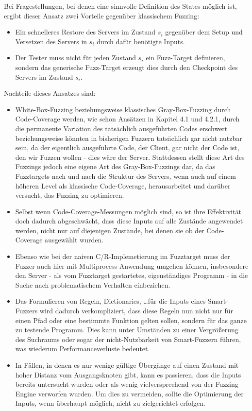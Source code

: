 \documentclass[a4paper]{article}
\begin{document}
Bei Fragestellungen, bei denen eine sinnvolle Definition des States möglich ist, ergibt dieser Ansatz zwei Vorteile gegenüber klassischem Fuzzing:
\begin{itemize}
    \item Ein schnelleres Restore des Servers im Zustand $s_i$ gegenüber dem Setup und Versetzen des Servers in $s_i$ durch dafür benötigte Inputs.
    \item Der Tester muss nicht für jeden Zustand $s_i$ ein Fuzz-Target definieren, sondern das generische Fuzz-Target erzeugt dies durch den Checkpoint des Servers im Zustand $s_i$.
\end{itemize}
Nachteile dieses Ansatzes sind:
\begin{itemize}
    \item White-Box-Fuzzing beziehungsweise klassisches Gray-Box-Fuzzing durch Code-Coverage werden, wie schon Ansätzen in Kapitel 4.1 und 4.2.1, durch die permanente Variation des tatsächlich ausgeführten Codes erschwert beziehungsweise könnten in bisherigen Fuzzern tatsächlich gar nicht nutzbar sein, da der eigentlich ausgeführte Code, der Client, gar nicht der Code ist, den wir Fuzzen wollen - dies wäre der Server. 
        Stattdessen stellt diese Art des Fuzzings jedoch eine eigene Art des Gray-Box-Fuzzings dar, da das Fuzztargets nach und nach die Struktur des Servers, wenn auch auf einem höheren Level als klassische Code-Coverage, herausarbeitet und darüber versucht, das Fuzzing zu optimieren.
    \item Selbst wenn Code-Coverage-Messungen möglich sind, so ist ihre Effektivität doch dadurch abgeschwächt, dass diese Inputs auf alle Zustände angewendet werden, nicht nur auf diejenigen Zustände, bei denen sie ob der Code-Coverage ausgewählt wurden. 
    \item Ebenso wie bei der naiven C/R-Implemetierung im Fuzztarget muss der Fuzzer auch hier mit Multiprocess-Anwendung umgehen können, insbesondere den Server - als vom Fuzztarget gestartetes, eigenständiges Programm - in die Suche nach problematischem Verhalten einbeziehen.
    \item Das Formulieren von Regeln, Dictionaries, \dots für die Inputs eines Smart-Fuzzers wird dadurch verkompliziert, dass diese Regeln nun nicht nur für einen Pfad oder eine bestimmte Funktion gelten sollen, sondern für das ganze zu testende Programm. 
        Dies kann unter Umständen zu einer Vergrößerung des Suchraums oder sogar der nicht-Nutzbarkeit von Smart-Fuzzern führen, was wiederum Performanceverluste bedeutet.
    \item In Fällen, in denen es nur wenige gültige Übergänge auf einen Zustand mit hoher Distanz vom Ausgangsknoten gibt, kann es passieren, dass die Inputs bereits untersucht wurden oder als wenig vielversprechend von der Fuzzing-Engine verworfen wurden. Um dies zu vermeiden, sollte die Optimierung der Inputs, wenn überhaupt möglich, nicht zu zielgerichtet erfolgen.
    
\end{itemize}
\end{document}
